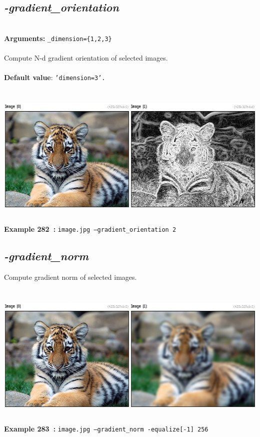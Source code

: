 \documentclass[a4paper,11pt,twoside]{book}
\begin{document}
\subsection{\emph{-gradient\_orientation} }\vspace*{-0.5em}
~\\\textbf{Arguments: } 
{\small \texttt{\_dimension=\{1,2,3\}}}\\~\\
Compute N-d gradient orientation of selected images.
~\\~\\\textbf{Default value}: {\small \texttt{'dimension=3'.}}
\begin{center}\includegraphics[keepaspectratio=true,height=7cm,width=\textwidth]{img/gmic_def282.jpg}\\
{\footnotesize \textbf{Example 282~:} \texttt{image.jpg --gradient\_orientation 2}}
\end{center}

\subsection{\emph{-gradient\_norm} }\vspace*{-0.5em}
Compute gradient norm of selected images.
\begin{center}\includegraphics[keepaspectratio=true,height=7cm,width=\textwidth]{img/gmic_def283.jpg}\\
{\footnotesize \textbf{Example 283~:} \texttt{image.jpg --gradient\_norm -equalize[-1] 256}}
\end{center}
\end{document}

